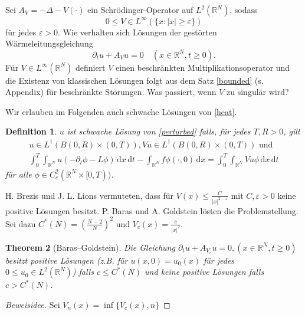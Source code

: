 \documentclass[11pt]{article}
\newtheorem{thm}{Theorem}
\newtheorem{df}[thm]{Definition}
\theoremstyle{break}
\begin{document}
Sei $A_V= -\Delta - V(\cdot)$ ein Schrödinger-Operator auf $L^2(\mathbb R^N)$, sodass
\begin{equation}
0\le V\in L^\infty(\{x:|x|\ge \varepsilon\})
\end{equation}\label{perturbed}
für jedes $\varepsilon>0$. Wie verhalten sich Lösungen der gestörten Wärmeleitungsgleichung 
\begin{equation}
\partial_t u +A_V u =0\quad (x\in \mathbb R^N, t\ge 0).
\end{equation}
Für $V\in L^\infty(\mathbb R^N)$ definiert $V$ einen beschränkten Multiplikationsoperator und die Existenz von klassischen Lösungen folgt aus dem Satz \ref{bounded} (s. Appendix) für beschränkte Störungen. %
Was passiert, wenn $V$ zu singulär wird?

Wir erlauben im Folgenden auch schwache Lösungen von \eqref{heat}. \vspace{.25cm}
\begin{df}
$u$ ist schwache Lösung von \eqref{perturbed} falls, für jedes $T, R>0$, gilt
\begin{gather}
u\in L^1(B(0,R) \times (0,T)), Vu \in L^1(B(0,R)\times (0,T)) \text{ und }\\
\int_0^T \int_{\mathbb R^N} u (-\partial_t \phi - L\phi) \, \mathrm dx \, \mathrm dt - \int_{\mathbb R^N} f \phi(\cdot, 0) \, \mathrm dx = \int_0^T \int_{\mathbb R^N} V u \phi \, \mathrm dx \, \mathrm dt
\end{gather}
für alle $\phi \in C_c^2(\mathbb R^N\times [0,T))$.
\end{df}

H. Brezis und J. L. Lions vermuteten, dass für $V(x) \le \frac{C}{|x|^{2-\varepsilon}}$ mit $C, \varepsilon>0$ keine positive Lösungen besitzt. P. Baras und A. Goldstein lösten die Problemstellung.  Sei dazu $C^*(N)=( \tfrac{N-2}{N} )^2$ und $V_c(x) = \frac{c}{|x|^2}$. \vspace{.25cm}

\begin{thm}[Baras--Goldstein]
Die Gleichung  $\partial_t u + A_{V_c} u =0, (x\in \mathbb R^N, t\ge0)$ besitzt positive Lösungen (z.B. für $u(x,0)=u_0(x)$ für jedes $0\le u_0\in L^2(\mathbb R^N)$) falls $c\le C^*(N)$ und keine positive Lösungen falls $c>C^*(N)$.
\end{thm}
\begin{proof}[Beweisidee]
Sei $V_n(x)=\inf\{V_c(x), n\}$ 
\end{proof}

\appendix
\end{document}
